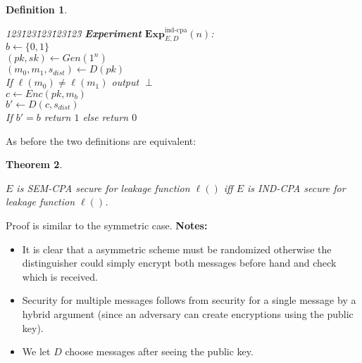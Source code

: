 \documentclass{article}
\newtheorem{thm}{Theorem}[section]
\newtheorem{defn}[thm]{Definition}
\newenvironment{theorem}{\begin{thm}\begin{rm}}%
{\end{rm}\end{thm}}
\newenvironment{definition}{\begin{defn}\begin{em}}%
{\end{em}\end{defn}}
\newcommand{\Exp}{\mathbf{Exp}}
\begin{document}
\begin{definition}
\begin{enumerate}
\begin{center}
\begin{minipage}{3in}
\begin{tabbing}
123\=123\=123\=123\=123\=\kill
\textbf{Experiment} $\Exp^{\mathrm{ind\mbox{-}cpa}}_{E,D}(n)$: \\
$b\leftarrow \{0,1\}$\\
$ (pk,sk) \leftarrow Gen(1^n)$ \\
$(m_0, m_1,s_{dist}) \leftarrow D(pk)$ \\
If $\ell(m_0)\neq \ell(m_1)$ output $\perp$\\
$c \leftarrow Enc(pk, m_b)$ \\
$b' \leftarrow D(c, s_{dist})$ \\
If $b' = b$ return $1$ else return $0$
\end{tabbing} \end{minipage} 
\end{center}
\end{enumerate}
\end{definition}
As before the two definitions are equivalent:
\begin{theorem}
$E$ is SEM-CPA secure for leakage function $\ell()$ iff $E$ is IND-CPA secure for leakage function $\ell()$.
\end{theorem}
Proof is similar to the symmetric case.
\textbf{Notes:} 
\begin{itemize}
\item It is clear that a asymmetric scheme must be randomized otherwise the distinguisher could simply encrypt both messages before hand and check which is received.
\item Security for multiple messages follows from security for a single message by a hybrid argument (since an adversary can create encryptions using the public key).
\item We let $D$ choose messages after seeing the public key.
\end{itemize}
\end{document}
